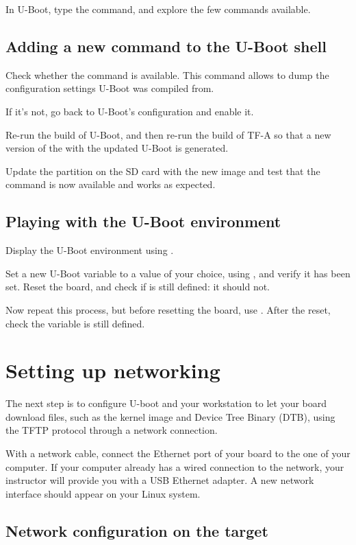 In U-Boot, type the  command, and explore the few commands
available.

\subsection{Adding a new command to the U-Boot shell}

Check whether the  command is available. This command
allows to dump the configuration settings U-Boot was compiled from.

If it's not, go back to U-Boot's configuration and enable it.

Re-run the build of U-Boot, and then re-run the build of TF-A so that
a new version of the  with the updated U-Boot is
generated.

Update the  partition on the SD card with the new
 image and test that the command is now available and
works as expected.

\subsection{Playing with the U-Boot environment}

Display the U-Boot environment using .

Set a new U-Boot variable  to a value of your choice, using
, and verify it has been set. Reset the board, and check
if  is still defined: it should not.

Now repeat this process, but before resetting the board, use
. After the reset, check the  variable is
still defined.

\section{Setting up networking}

The next step is to configure U-boot and your workstation to let your
board download files, such as the kernel image and Device Tree Binary
(DTB), using the TFTP protocol through a network connection.

With a network cable, connect the Ethernet port of
your board to the one of your computer. If your computer already has a
wired connection to the network, your instructor will provide you with
a USB Ethernet adapter. A new network interface should appear on your
Linux system.

\subsection{Network configuration on the target}

